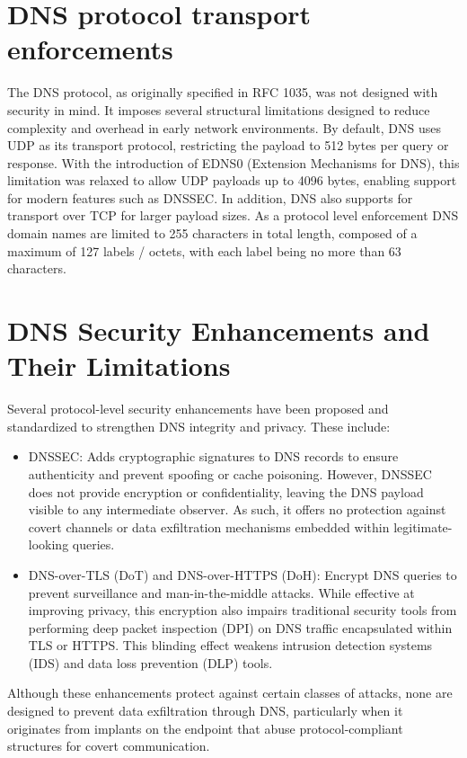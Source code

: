 \documentclass [11pt, proquest] {uwthesis}[2020/02/24]
\begin{document}
\section{DNS protocol transport enforcements}
The DNS protocol, as originally specified in RFC 1035, was not designed with security in mind. It imposes several structural limitations designed to reduce complexity and overhead in early network environments. By default, DNS uses UDP as its transport protocol, restricting the payload to 512 bytes per query or response. With the introduction of EDNS0 (Extension Mechanisms for DNS), this limitation was relaxed to allow UDP payloads up to 4096 bytes, enabling support for modern features such as DNSSEC. In addition, DNS also supports for transport over TCP for larger payload sizes. As a protocol level enforcement DNS domain names are limited to 255 characters in total length, composed of a maximum of 127 labels / octets, with each label being no more than 63 characters. 
\section{DNS Security Enhancements and Their Limitations}
Several protocol-level security enhancements have been proposed and standardized to strengthen DNS integrity and privacy. These include:
\begin{itemize}
    \item DNSSEC: Adds cryptographic signatures to DNS records to ensure authenticity and prevent spoofing or cache poisoning. However, DNSSEC does not provide encryption or confidentiality, leaving the DNS payload visible to any intermediate observer. As such, it offers no protection against covert channels or data exfiltration mechanisms embedded within legitimate-looking queries.
    \item DNS-over-TLS (DoT) and DNS-over-HTTPS (DoH): Encrypt DNS queries to prevent surveillance and man-in-the-middle attacks. While effective at improving privacy, this encryption also impairs traditional security tools from performing deep packet inspection (DPI) on DNS traffic encapsulated within TLS or HTTPS. This blinding effect weakens intrusion detection systems (IDS) and data loss prevention (DLP) tools.
\end{itemize}
Although these enhancements protect against certain classes of attacks, none are designed to prevent data exfiltration through DNS, particularly when it originates from implants on the endpoint that abuse protocol-compliant structures for covert communication.
\end{document}
